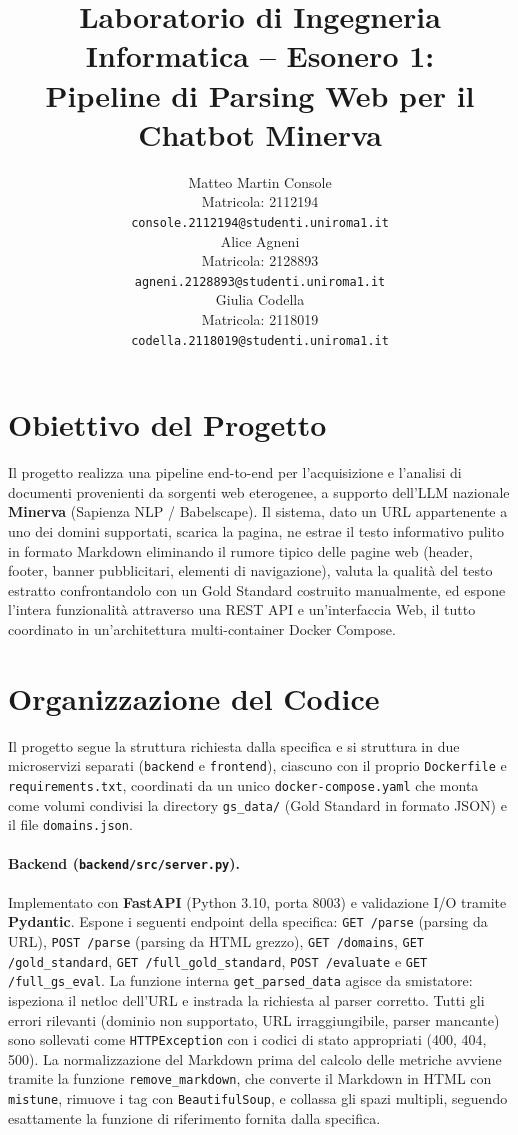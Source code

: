\documentclass[11pt]{article}
\title{Laboratorio di Ingegneria Informatica -- Esonero 1:\\
Pipeline di Parsing Web per il Chatbot Minerva}
\author{Matteo Martin Console \\
  Matricola: 2112194 \\
  {\scriptsize \texttt{console.2112194@studenti.uniroma1.it}} \\\And
  Alice Agneni \\
  Matricola: 2128893 \\
  {\scriptsize \texttt{agneni.2128893@studenti.uniroma1.it}} \\\And
  Giulia Codella \\
  Matricola: 2118019 \\
  {\scriptsize \texttt{codella.2118019@studenti.uniroma1.it}} \\}
\begin{document}
\maketitle

\section{Obiettivo del Progetto}

Il progetto realizza una pipeline end-to-end per l'acquisizione e l'analisi di documenti provenienti da sorgenti web eterogenee, a supporto dell'LLM nazionale \textbf{Minerva} (Sapienza NLP / Babelscape). Il sistema, dato un URL appartenente a uno dei domini supportati, scarica la pagina, ne estrae il testo informativo pulito in formato Markdown eliminando il rumore tipico delle pagine web (header, footer, banner pubblicitari, elementi di navigazione), valuta la qualità del testo estratto confrontandolo con un Gold Standard costruito manualmente, ed espone l’intera funzionalità
attraverso una REST API e un’interfaccia Web, il tutto coordinato in un’architettura multi-container Docker Compose.

\section{Organizzazione del Codice}

Il progetto segue la struttura richiesta dalla specifica e si struttura in due microservizi separati (\texttt{backend} e \texttt{frontend}), ciascuno con il proprio \texttt{Dockerfile} e \texttt{requirements.txt}, coordinati da un unico \texttt{docker-compose.yaml} che monta come volumi condivisi la directory \texttt{gs\_data/} (Gold Standard in formato JSON) e il file \texttt{domains.json}.

\paragraph{Backend (\texttt{backend/src/server.py}).}
Implementato con \textbf{FastAPI} (Python 3.10, porta 8003) e validazione I/O tramite \textbf{Pydantic}. Espone i seguenti endpoint della specifica: \texttt{GET /parse} (parsing da URL), \texttt{POST /parse} (parsing da HTML grezzo), \texttt{GET /domains}, \texttt{GET /gold\_standard}, \texttt{GET /full\_gold\_standard}, \texttt{POST /evaluate} e \texttt{GET /full\_gs\_eval}. La funzione interna \texttt{get\_parsed\_data} agisce da smistatore: ispeziona il netloc dell'URL e instrada la richiesta al parser corretto. Tutti gli errori rilevanti (dominio non supportato, URL irraggiungibile, parser mancante) sono sollevati come \texttt{HTTPException} con i codici di stato appropriati (400, 404, 500). La normalizzazione del Markdown prima del calcolo delle metriche avviene tramite la funzione \texttt{remove\_markdown}, che converte il Markdown in HTML con \texttt{mistune}, rimuove i tag con \texttt{BeautifulSoup}, e collassa gli spazi multipli, seguendo esattamente la funzione di riferimento fornita dalla specifica.
\end{document}
